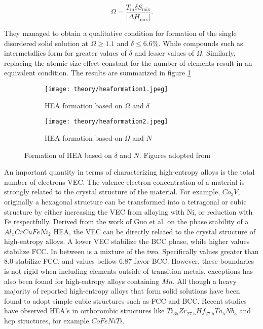 \begin{equation}
\Omega = \frac{T_\text{m} \delta S_\text{mix}}{|\Delta H_\text{mix}|}.
\end{equation}

They managed to obtain a qualitative condition for formation of the single disordered solid solution at $\Omega \geq 1.1$ and $\delta \leq 6.6\%$. While compounds such as intermetallics form for greater values of $\delta$ and lesser values of $\Omega$. Similarly, replacing the atomic size effect constant for the number of elements result in an equivalent condition. The results are summarized in figure \ref{Omega}

\begin{figure} 
\centering
\begin{subfigure}{0.7\textwidth}
\texttt{[image: theory/heaformation1.jpeg]}
\caption{HEA formation based on $\Omega$ and $\delta$}
\end{subfigure}
\begin{subfigure}{0.7\textwidth}
\texttt{[image: theory/heaformation2.jpeg]}
\caption{HEA formation based on $\Omega$ and $N$}
\end{subfigure}
\caption{Formation of HEA based on $\delta$ and $N$. Figures adopted from \cite{hea2016_ch2}}
\label{Omega} 
\end{figure} 

An important quantity in terms of characterizing high-entropy alloys is the total number of electrons VEC. The valence electron concentration of a material is strongly related to the crystal structure of the material. For example, $Co_3V$, originally a hexagonal structure can be transformed into a tetragonal or cubic structure by either increasing the VEC from alloying with Ni, or reduction with Fe respectfully. Derived from the work of Guo et al. on the phase stability of a $Al_xCrCuFeNi_2$ HEA, the VEC can be directly related to the crystal structure of high-entropy alloys. A lower VEC stabilize the BCC phase, while higher values stabilize FCC. In between is a mixture of the two. Specifically values greater than 8.0 stabilize FCC, and values bellow 6.87 favor BCC. However, these boundaries is not rigid when including elements outside of transition metals, exceptions has also been found for high-entropy alloys containing $Mn$. All though a heavy majority of reported high-entropy alloys that form solid solutions have been found to adopt simple cubic structures such as FCC and BCC. Recent studies have observed HEA's in orthorombic structures like $Ti_{35}Zr_{27.5}Hf_{27.5}Ta_5Nb_5$ and hcp structures, for example $CoFeNiTi$.

